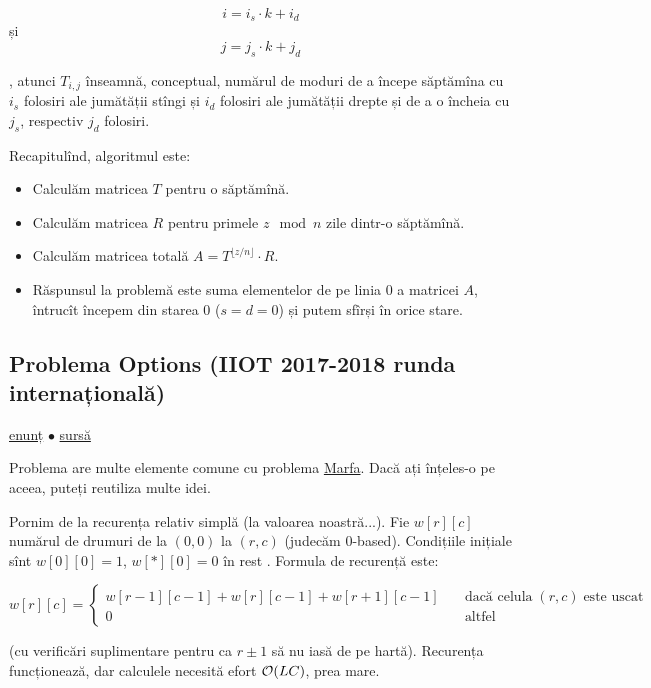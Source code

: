 \documentclass[../main.tex]{subfiles}
\begin{document}
$$i = i_s \cdot k + i_d$$ și $$j = j_s \cdot k + j_d$$

, atunci $T_{i,j}$ înseamnă, conceptual, numărul de moduri de a începe săptămîna cu $i_s$ folosiri ale jumătății stîngi și $i_d$ folosiri ale jumătății drepte și de a o încheia cu $j_s$, respectiv $j_d$ folosiri.

Recapitulînd, algoritmul este:

\begin{itemize}
  \item Calculăm matricea $T$ pentru o săptămînă.

  \item Calculăm matricea $R$ pentru primele $z \mod n$ zile dintr-o săptămînă.

  \item Calculăm matricea totală $A = T^{\lfloor z/n\rfloor} \cdot R$.

  \item Răspunsul la problemă este suma elementelor de pe linia 0 a matricei $A$, întrucît începem din starea 0 ($s = d = 0$) și putem sfîrși în orice stare.
\end{itemize}

\subsection{Problema Options (IIOT 2017-2018 runda internațională)}
\label{problem:options}

\href{https://kilonova.ro/problems/2893}{enunț}
$\bullet$
\hyperref[code:options]{sursă}

Problema are multe elemente comune cu problema \hyperref[problem:marfa]{Marfa}. Dacă ați înțeles-o pe aceea, puteți reutiliza multe idei.

Pornim de la recurența relativ simplă (la valoarea noastră...). Fie $w[r][c]$ numărul de drumuri de la $(0,0)$ la $(r, c)$ (judecăm 0-based). Condițiile inițiale sînt $w[0][0] = 1$, $w[*][0] = 0$ în rest . Formula de recurență este:

$$
w[r][c] =
\begin{cases}
w[r - 1][c - 1] + w[r][c - 1] + w[r + 1][c - 1] & \quad \textrm{dacă celula} \; (r, c) \; \textrm{este uscat} \\
0 & \quad \textrm{altfel}
\end{cases}
$$

(cu verificări suplimentare pentru ca $r \pm 1$ să nu iasă de pe hartă). Recurența funcționează, dar calculele necesită efort $\mathcal{O}(LC)$, prea mare.
\end{document}
